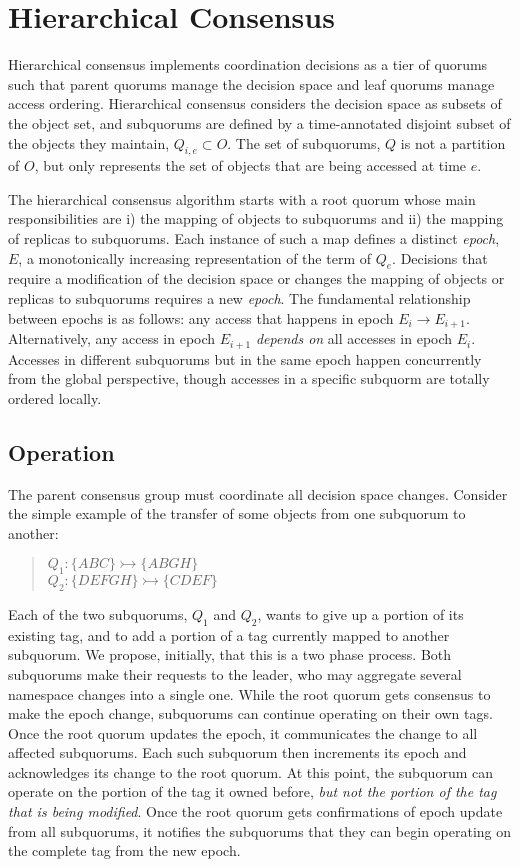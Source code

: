 \documentclass[sigconf]{acmart}
\begin{document}
\section{Hierarchical Consensus}

Hierarchical consensus implements coordination decisions as a tier of quorums such that
parent quorums manage the decision space and leaf quorums manage access ordering.
Hierarchical consensus considers the decision space as subsets of the object set, and
subquorums are defined by a time-annotated disjoint subset of the objects they maintain,
$Q_{i,e} \subset O$.
The set of subquorums, $Q$ is not a partition of $O$, but only represents the set of
objects that are being accessed at time $e$.

The hierarchical consensus algorithm starts with a root quorum whose main
responsibilities are i) the mapping of objects to subquorums and ii) the mapping of
replicas to subquorums.
Each instance of such a map defines a distinct \textit{epoch}, $E$, a monotonically
increasing representation of the term of $Q_e$.
Decisions that require a modification of the decision space or changes the mapping of
objects or replicas to subquorums requires a new \textit{epoch}. The fundamental
relationship between epochs is as follows: any access that happens in epoch
$E_i \rightarrow E_{i+1}$. Alternatively, any access in epoch $E_{i+1}$
\textit{depends on} all accesses in epoch $E_i$.
Accesses in different subquorums but in the same epoch happen concurrently from the global
perspective, though accesses in a specific subquorm are totally ordered locally.

\subsection{Operation}

The parent consensus group must coordinate all decision space changes.
Consider the simple example of the transfer of some objects from one subquorum to another:

\begin{quote}
\small
   $Q_1: \{ABC\} \rightarrowtail \{ABGH\}$\\
   $Q_2: \{DEFGH\} \rightarrowtail \{CDEF\}$
\end{quote}

Each of the two subquorums, $Q_1$ and $Q_2$, wants to give up a portion of its
existing tag, and to add a portion of a tag currently mapped to another subquorum.
We propose, initially, that this is a two phase process.
Both subquorums make their requests to the leader, who may aggregate several namespace
changes into a single one.
While the root quorum gets consensus to make the epoch change, subquorums can continue
operating on their own tags.
Once the root quorum updates the epoch, it communicates the change to all affected subquorums.
Each such subquorum then increments its epoch and acknowledges its change to the root quorum.
At this point, the subquorum can operate on the portion of the tag it owned before,
\emph{but not the portion of the tag that is being modified}.
Once the root quorum gets confirmations of epoch update from all subquorums, it notifies
the subquorums that they can begin operating on the complete tag from the new epoch.
\end{document}
